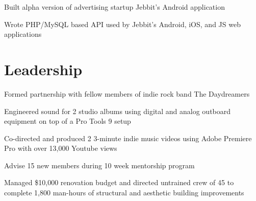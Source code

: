 \documentclass[letterpaper]{deedy-resume} %
\begin{document}
\begin{minipage}[t]{0.66\textwidth}


\begin{tightitemize}
\item Built alpha version of advertising startup Jebbit's Android application
\item Wrote PHP/MySQL based API used by Jebbit's Android, iOS, and JS web applications

\end{tightitemize}

\sectionspace %



\section{Leadership} 


\begin{tightitemize}
\item Formed partnership with fellow members of indie rock band The Daydreamers
\item Engineered sound for 2 studio albums using digital and analog outboard equipment on top of a Pro Tools 9 setup
\item Co-directed and produced 2 3-minute indie music videos using Adobe Premiere Pro with over 13,000 Youtube views
\end{tightitemize}

\sectionspace %



\begin{tightitemize}
\item Advise 15 new members during 10 week mentorship program
\item Managed \$10,000 renovation budget and directed untrained crew of 45 to complete 1,800 man-hours of structural and aesthetic building improvements
\end{tightitemize}


\end{minipage}
\end{document}

